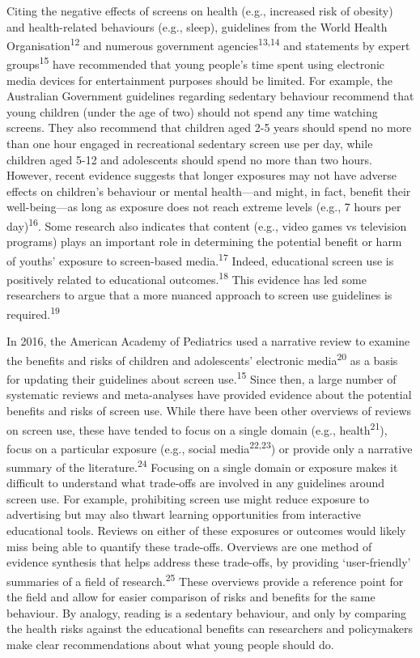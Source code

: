 \documentclass[
  english,
  man]{apa6}
\begin{document}
Citing the negative effects of screens on health (e.g., increased risk of obesity) and health-related behaviours (e.g., sleep), guidelines from the World Health Organisation\textsuperscript{12} and numerous government agencies\textsuperscript{13,14} and statements by expert groups\textsuperscript{15} have recommended that young people's time spent using electronic media devices for entertainment purposes should be limited.
For example, the Australian Government guidelines regarding sedentary behaviour recommend that young children (under the age of two) should not spend any time watching screens.
They also recommend that children aged 2-5 years should spend no more than one hour engaged in recreational sedentary screen use per day, while children aged 5-12 and adolescents should spend no more than two hours.
However, recent evidence suggests that longer exposures may not have adverse effects on children's behaviour or mental health---and might, in fact, benefit their well-being---as long as exposure does not reach extreme levels (e.g., 7 hours per day)\textsuperscript{16}.
Some research also indicates that content (e.g., video games vs television programs) plays an important role in determining the potential benefit or harm of youths' exposure to screen-based media.\textsuperscript{17}
Indeed, educational screen use is positively related to educational outcomes.\textsuperscript{18}
This evidence has led some researchers to argue that a more nuanced approach to screen use guidelines is required.\textsuperscript{19}

In 2016, the American Academy of Pediatrics used a narrative review to examine the benefits and risks of children and adolescents' electronic media\textsuperscript{20} as a basis for updating their guidelines about screen use.\textsuperscript{15}
Since then, a large number of systematic reviews and meta-analyses have provided evidence about the potential benefits and risks of screen use.
While there have been other overviews of reviews on screen use, these have tended to focus on a single domain (e.g., health\textsuperscript{21}), focus on a particular exposure (e.g., social media\textsuperscript{22,23}) or provide only a narrative summary of the literature.\textsuperscript{24}
Focusing on a single domain or exposure makes it difficult to understand what trade-offs are involved in any guidelines around screen use.
For example, prohibiting screen use might reduce exposure to advertising but may also thwart learning opportunities from interactive educational tools.
Reviews on either of these exposures or outcomes would likely miss being able to quantify these trade-offs.
Overviews are one method of evidence synthesis that helps address these trade-offs, by providing `user-friendly' summaries of a field of research.\textsuperscript{25}
These overviews provide a reference point for the field and allow for easier comparison of risks and benefits for the same behaviour.
By analogy, reading is a sedentary behaviour, and only by comparing the health risks against the educational benefits can researchers and policymakers make clear recommendations about what young people should do.
\end{document}

